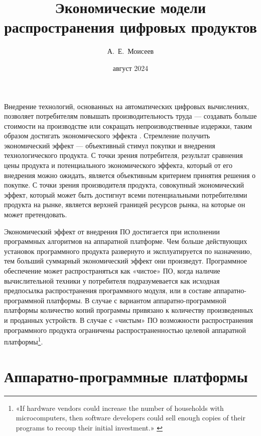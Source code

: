 \documentclass{article}
\title{Экономические модели распространения цифровых продуктов}
\author{А.~Е.~Моисеев}
\date{август 2024}
\begin{document}
\maketitle

Внедрение технологий, основанных на автоматических цифровых вычислениях, позволяет потребителям повышать производительность труда — создавать больше стоимости на производстве или сокращать непроизводственные издержки, таким образом достигать экономического эффекта \cite{ecoEffects}. Стремление получить экономический эффект — объективный стимул покупки и внедрения технологического продукта. С точки зрения потребителя, результат сравнения цены продукта и потенциального экономического эффекта, который от его внедрения можно ожидать, является объективным критерием принятия решения о покупке. С точки зрения производителя продукта, совокупный экономический эффект, который может быть достигнут всеми потенциальными потребителями продукта на рынке, является верхней границей ресурсов рынка, на которые он может претендовать.

Экономический эффект от внедрения ПО достигается при исполнении программных алгоритмов на аппаратной платформе. Чем больше действующих установок программного продукта развернуто и эксплуатируется по назначению, тем больший суммарный экономический эффект они произведут. Программное обеспечение может распространяться как «чистое» ПО, когда наличие вычислительной техники у потребителя подразумевается как исходная предпосылка распространения программного модуля, или в составе аппаратно-программной платформы. В случае с вариантом аппаратно-программной платформы количество копий программы привязано к количеству произведенных и проданных устройств. В случае с «чистым» ПО возможности распространения программного продукта ограничены распространенностью целевой аппаратной платформы\footnote{«If hardware vendors could increase the number of households with microcomputers, then software developers could sell enough copies of their programs to recoup their initial investment.» \cite{driscollOpenLetter}}.

\section*{Аппаратно-программные платформы}
\end{document}
